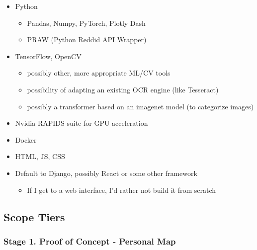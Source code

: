 \documentclass[
]{article}
\providecommand{\tightlist}{%
  \setlength{\itemsep}{0pt}\setlength{\parskip}{0pt}}
\begin{document}
\begin{itemize}
\tightlist
\item
  Python

  \begin{itemize}
  \tightlist
  \item
    Pandas, Numpy, PyTorch, Plotly Dash\\
  \item
    PRAW (Python Reddid API Wrapper)
  \end{itemize}
\item
  TensorFlow, OpenCV

  \begin{itemize}
  \tightlist
  \item
    possibly other, more appropriate ML/CV tools\\
  \item
    possibility of adapting an existing OCR engine (like Tesseract)\\
  \item
    possibly a transformer based on an imagenet model (to categorize
    images)\\
  \end{itemize}
\item
  Nvidia RAPIDS suite for GPU acceleration\\
\item
  Docker\\
\item
  HTML, JS, CSS\\
\item
  Default to Django, possibly React or some other framework

  \begin{itemize}
  \tightlist
  \item
    If I get to a web interface, I'd rather not build it from scratch
  \end{itemize}
\end{itemize}

\hypertarget{scope-tiers}{%
\subsection{Scope Tiers}\label{scope-tiers}}

\hypertarget{stage-1.-proof-of-concept---personal-map}{%
\subsubsection{Stage 1. Proof of Concept - Personal
Map}\label{stage-1.-proof-of-concept---personal-map}}
\end{document}
